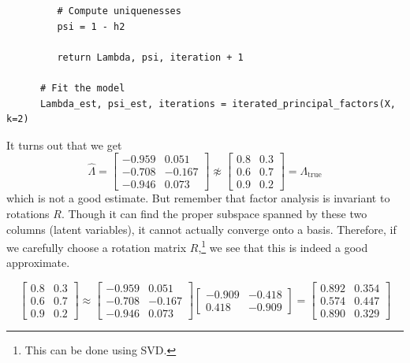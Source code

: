\begin{example}
\begin{lstlisting}
         # Compute uniquenesses
         psi = 1 - h2
         
         return Lambda, psi, iteration + 1

      # Fit the model
      Lambda_est, psi_est, iterations = iterated_principal_factors(X, k=2)
    \end{lstlisting}

    It turns out that we get 
    \begin{equation}
      \hat{\Lambda} = \begin{bmatrix}
        -0.959 & 0.051 \\
        -0.708 & -0.167 \\
        -0.946 & 0.073
      \end{bmatrix} \not\approx \begin{bmatrix}
        0.8 & 0.3 \\
        0.6 & 0.7 \\
        0.9 & 0.2
      \end{bmatrix} = \Lambda_{\mathrm{true}}
    \end{equation}
    which is not a good estimate. But remember that factor analysis is invariant to rotations $R$. Though it can find the proper subspace spanned by these two columns (latent variables), it cannot actually converge onto a basis. Therefore, if we carefully choose a rotation matrix $R$,\footnote{This can be done using SVD.} we see that this is indeed a good approximate. 

    \begin{equation}
      \begin{bmatrix}
        0.8 & 0.3 \\
        0.6 & 0.7 \\
        0.9 & 0.2
      \end{bmatrix} \approx 
      \begin{bmatrix}
        -0.959 & 0.051 \\
        -0.708 & -0.167 \\
        -0.946 & 0.073
      \end{bmatrix} 
      \begin{bmatrix}
        -0.909 & -0.418 \\
        0.418 & -0.909
      \end{bmatrix} = \begin{bmatrix}
        0.892 & 0.354 \\
        0.574 & 0.447 \\
        0.890 & 0.329
      \end{bmatrix}
    \end{equation}


\end{example}
